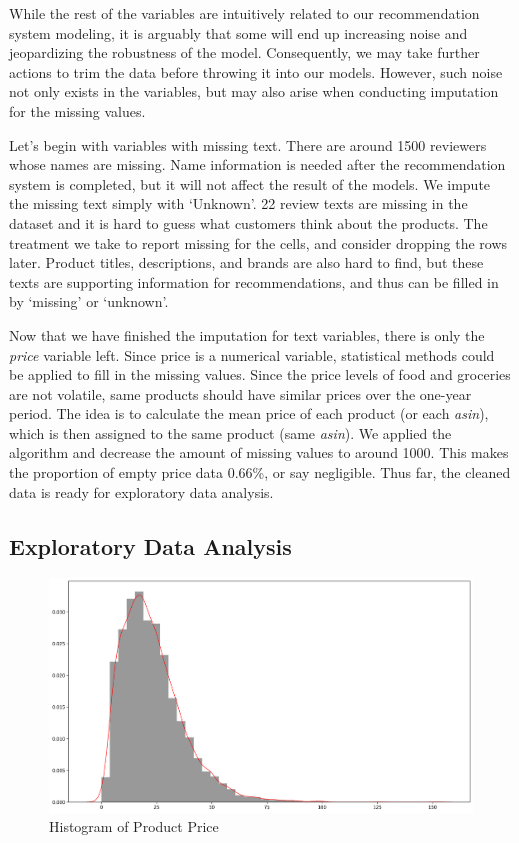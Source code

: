 \documentclass[final, 3p,12pt,times,letter,twocolumn]{elsarticle}
\begin{document}
While the rest of the variables are intuitively related to our recommendation system modeling, it is arguably that some will end up increasing noise and  jeopardizing the robustness of the model. Consequently, we may take further actions to trim the data before throwing it into our models. However, such noise not only exists in the variables, but may also arise when conducting imputation for the missing values.

Let's begin with variables with missing text. There are around 1500 reviewers whose names are missing. Name information is needed after the recommendation system is completed, but it will not affect the result of the models. We impute the missing text simply with `Unknown'. 22 review texts are missing in the dataset and it is hard to guess what customers think about the products. The treatment we take to report missing for the cells, and consider dropping the rows later. Product titles, descriptions, and brands are also hard to find, but these texts are supporting information for recommendations, and thus can be filled in by `missing' or `unknown'. 

Now that we have finished the imputation for text variables, there is only the \textit{price} variable left. Since price is a numerical variable, statistical methods could be applied to fill in the missing values. Since the price levels of food and groceries are not volatile, same products should have similar prices over the one-year period. The idea is to calculate the mean price of each product (or each \textit{asin}), which is then assigned to the same product (same \textit{asin}). We applied the algorithm and decrease the amount of missing values to around 1000. This makes the proportion of empty price data 0.66\%, or say negligible. Thus far, the cleaned data is ready for exploratory data analysis.

\subsection{Exploratory Data Analysis}

\begin{figure}[h]
\centering
\caption{Histogram of Product Price}
\includegraphics[width=1\linewidth]{meanprice_hist}
\end{figure}
\end{document}
